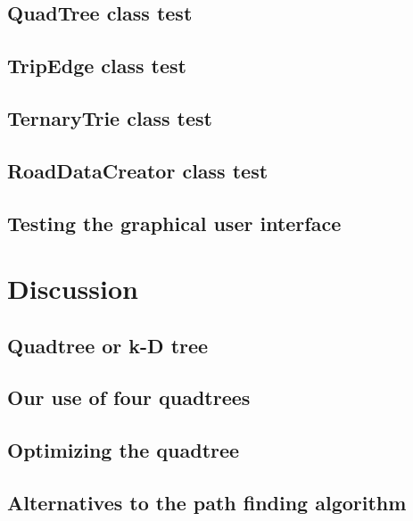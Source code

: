 \documentclass[a4paper,11pt]{article}
\begin{document}
\subsection{QuadTree class test}


\subsection{TripEdge class test}


\subsection{TernaryTrie class test}

\subsection{RoadDataCreator class test}


\subsection{Testing the graphical user interface}


\pagebreak
\section{Discussion}
\label{sec:Discussion}

\subsection{Quadtree or k-D tree}


\subsection{Our use of four quadtrees}


\subsection{Optimizing the quadtree}


\subsection{Alternatives to the path finding algorithm}

\end{document}
